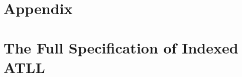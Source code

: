 \documentclass{llncs}
\begin{document}



\appendix

\section*{Appendix}
\label{sec:appendix}

\section{The Full Specification of Indexed ATLL}
\label{subsec:the_full_specification_of_indexed_atll}


\end{document}
